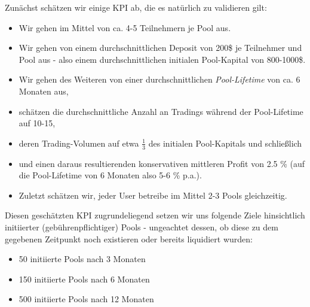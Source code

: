 \begin{Assumption}\label{bp}

\vspace{0.75cm}


\vspace{0.75cm}

Zunächst schätzen wir einige KPI ab, die es natürlich zu validieren gilt:

\begin{itemize}
	\item Wir gehen im Mittel von ca. 4-5 Teilnehmern je Pool aus.
	\item Wir gehen von einem durchschnittlichen Deposit von 200\$ je Teilnehmer und Pool aus - also einem durchschnittlichen initialen Pool-Kapital von 800-1000\$.
	\item Wir gehen des Weiteren von einer durchschnittlichen \textit{Pool-Lifetime} von ca. 6 Monaten aus,
	\item schätzen die durchschnittliche Anzahl an Tradings während der Pool-Lifetime auf 10-15,
	\item deren Trading-Volumen auf etwa $\frac{1}{3}$ des initialen Pool-Kapitals und schließlich 
	\item und einen daraus resultierenden konservativen mittleren Profit von 2.5 \% (auf die Pool-Lifetime von 6 Monaten also 5-6 \% p.a.).
	\item Zuletzt schätzen wir, jeder User betreibe im Mittel 2-3 Pools gleichzeitig.
\end{itemize}

\vspace{0.5cm}

Diesen geschätzten KPI zugrundeliegend setzen wir uns folgende Ziele hinsichtlich initiierter (gebührenpflichtiger) Pools - ungeachtet dessen, ob diese zu dem gegebenen Zeitpunkt noch existieren oder bereits liquidiert wurden:

\begin{itemize}
	\item 50 initiierte Pools nach 3 Monaten
	\item 150 initiierte Pools nach 6 Monaten
	\item 500 initiierte Pools nach 12 Monaten
\end{itemize}

\end{Assumption}

\vspace{0.5cm}

